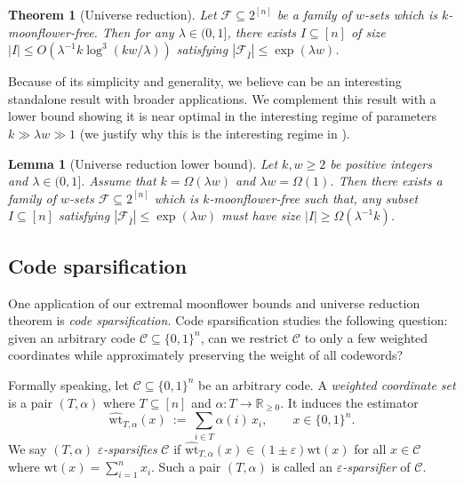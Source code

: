 \documentclass{article}
\newtheorem{theorem}{Theorem}[section]
\newtheorem{lemma}[lemma]{Lemma}
\newcommand{\rr}{\mathbb{R}}
\newcommand{\<}{\langle}
\renewcommand{\>}{\rangle}
\newcommand{\calC}{\mathcal{C}}
\newcommand{\calF}{\mathcal{F}}
\begin{document}
\begin{theorem}[Universe reduction]\label{thm:universe_reduction}
    Let $\calF \subseteq 2^{[n]}$ be a family of $w$-sets which is $k$-moonflower-free. Then for any $\lambda \in (0, 1]$, there exists $I \subseteq [n]$ of size $|I| \leq O(\lambda^{-1}k \log^3 (kw / \lambda))$ satisfying $|\calF_{\bar{I}}| \leq \exp (\lambda w)$.
\end{theorem}

Because of its simplicity and generality, we believe  can be an interesting standalone result with broader applications. We complement this result with a lower bound showing it is near optimal in the interesting regime of parameters $k \gg \lambda w \gg 1$ (we justify why this is the interesting regime in ). 

\begin{lemma}[Universe reduction lower bound]\label{lem:universe_reduction_lower_bnd}
    Let $k, w \geq 2$ be positive integers and $\lambda \in (0,1]$. Assume that $k=\Omega(\lambda w)$ and $\lambda w = \Omega(1)$. Then there exists a family of $w$-sets $\calF \subseteq 2^{[n]}$ which is $k$-moonflower-free such that, any subset $I \subseteq [n]$ satisfying $|\calF_{\bar{I}}| \leq \exp (\lambda w)$ must have size $|I| \geq \Omega(\lambda^{-1}k)$. 
\end{lemma}








\subsection{Code sparsification}
One application of our extremal moonflower bounds and universe reduction theorem is \emph{code sparsification.} Code sparsification studies the following question: given an arbitrary code $\calC \subseteq \{0, 1\}^n$, can we restrict $\calC$ to only a few weighted coordinates while approximately preserving the weight of all codewords?

Formally speaking, let $\calC \subseteq \{0, 1\}^{n}$ be an arbitrary code. A \emph{weighted coordinate set} is a pair $(T, \alpha)$ where $T \subseteq [n]$ and $\alpha: T \to \rr_{\geq 0}$. It induces the estimator
\[
\widehat{\mathrm{wt}}_{T,\alpha}(x)\ :=\ \sum_{i\in T}\alpha(i)\,x_i,
\qquad x\in\{0,1\}^n.
\]
We say $(T,\alpha)$ \emph{$\varepsilon$-sparsifies} $\calC$ if
$\widehat{\mathrm{wt}}_{T,\alpha}(x)\in (1\pm\varepsilon)\mathrm{wt}(x)$ for all $x\in\calC$ where $\mathrm{wt}(x)=\sum_{i=1}^n x_i$. Such a pair $(T, \alpha)$ is called an \emph{$\varepsilon$-sparsifier} of $\calC$.
\end{document}
